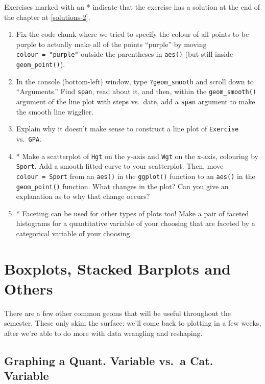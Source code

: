 \documentclass[
]{book}
\begin{document}
Exercises marked with an * indicate that the exercise has a solution at the end of the chapter at \ref{solutions-2}.

\begin{enumerate}
\def\labelenumi{\arabic{enumi}.}
\item
  Fix the code chunk where we tried to specify the colour of all points to be purple to actually make all of the points ``purple'' by moving \texttt{colour\ =\ "purple"} outside the parentheses in \texttt{aes()} (but still inside \texttt{geom\_point()}).
\item
  In the console (bottom-left) window, type \texttt{?geom\_smooth} and scroll down to ``Arguments.'' Find \texttt{span}, read about it, and then, within the \texttt{geom\_smooth()} argument of the line plot with steps vs.~date, add a \texttt{span} argument to make the smooth line wigglier.
\item
  Explain why it doesn't make sense to construct a line plot of \texttt{Exercise} vs.~\texttt{GPA}.
\item
  * Make a scatterplot of \texttt{Hgt} on the y-axis and \texttt{Wgt} on the x-axis, colouring by \texttt{Sport}. Add a smooth fitted curve to your scatterplot. Then, move \texttt{colour\ =\ Sport} from an \texttt{aes()} in the \texttt{ggplot()} function to an \texttt{aes()} in the \texttt{geom\_point()} function. What changes in the plot? Can you give an explanation as to why that change occurs?
\item
  * Faceting can be used for other types of plots too! Make a pair of faceted histograms for a quantitative variable of your choosing that are faceted by a categorical variable of your choosing.
\end{enumerate}

\hypertarget{boxplots-stacked-barplots-and-others}{%
\section{Boxplots, Stacked Barplots and Others}\label{boxplots-stacked-barplots-and-others}}

There are a few other common geoms that will be useful throughout the semester. These only skim the surface: we'll come back to plotting in a few weeks, after we're able to do more with data wrangling and reshaping.

\hypertarget{graphing-a-quant.-variable-vs.-a-cat.-variable}{%
\subsection{Graphing a Quant. Variable vs.~a Cat. Variable}\label{graphing-a-quant.-variable-vs.-a-cat.-variable}}
\end{document}
